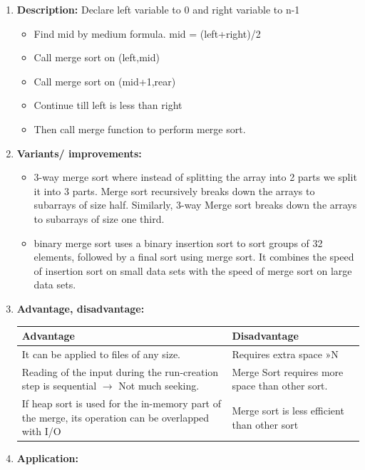 \documentclass[11pt,a4paper]{article}
\begin{document}
{\begin{enumerate}[label=\textbf{\arabic*})]
				\item \textbf{Description:}
					Declare left variable to 0 and right variable to n-1 
					\begin{itemize}
						\item Find mid by medium formula. mid = (left+right)/2
						\item Call merge sort on (left,mid)
						\item Call merge sort on (mid+1,rear)
						\item Continue till left is less than right
						\item Then call merge function to perform merge sort.
					\end{itemize}
				\item \textbf{Variants/ improvements:}
					\begin{itemize}
						\item 3-way merge sort where instead of splitting the array into 2 parts we split it into 3 parts. Merge sort recursively breaks down the arrays to subarrays of size half. Similarly, 3-way Merge sort breaks down the arrays to subarrays of size one third. 
						\item binary merge sort uses a binary insertion sort to sort groups of 32 elements, followed by a final sort using merge sort. It combines the speed of insertion sort on small data sets with the speed of merge sort on large data sets.
					\end{itemize}
				\item \textbf{Advantage, disadvantage:}
					\begin{table}[H]
						\centering
						\begin{tabular}{|p{8cm}|p{8cm}|}
							\hline
							\textbf{Advantage} & \textbf{Disadvantage} \\
							\hline
							\hline
							It can be applied to files of any size. & Requires extra space »N \\[12pt]
							Reading of the input during the run-creation step is sequential $\rightarrow$ Not much seeking. & Merge Sort requires more space than other sort.\\[12pt]
							If heap sort is used for the in-memory part of the merge, its operation can be overlapped with I/O & Merge sort is less efficient than other sort\\
							\hline
						\end{tabular}
					\end{table}
				\item \textbf{Application:}	
					\begin{itemize}

\end{itemize}
\end{enumerate}}
\end{document}
